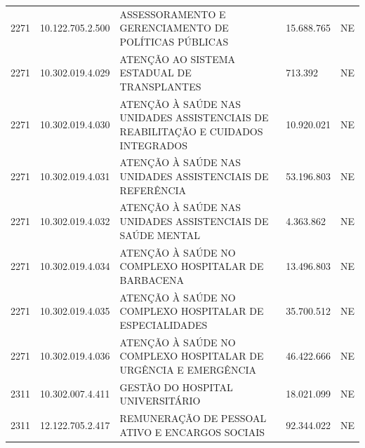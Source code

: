 \documentclass{article}
\begin{document}
\begin{longtable}[c]{m{1cm}|m{2cm}|m{10cm}|m{2cm}|m{1cm}}
\multicolumn{1}{C{1cm}|}{2271} & \multicolumn{1}{C{2cm}|}{10.122.705.2.500} & \multicolumn{1}{L{10cm}|}{ASSESSORAMENTO E GERENCIAMENTO DE POLÍTICAS PÚBLICAS} & \multicolumn{1}{R{2cm}|}{15.688.765} & \multicolumn{1}{C{1cm}}{NE} \\
\multicolumn{1}{C{1cm}|}{2271} & \multicolumn{1}{C{2cm}|}{10.302.019.4.029} & \multicolumn{1}{L{10cm}|}{ATENÇÃO  AO SISTEMA ESTADUAL DE TRANSPLANTES} & \multicolumn{1}{R{2cm}|}{713.392} & \multicolumn{1}{C{1cm}}{NE} \\
\multicolumn{1}{C{1cm}|}{2271} & \multicolumn{1}{C{2cm}|}{10.302.019.4.030} & \multicolumn{1}{L{10cm}|}{ATENÇÃO À SAÚDE NAS UNIDADES ASSISTENCIAIS DE REABILITAÇÃO E CUIDADOS INTEGRADOS} & \multicolumn{1}{R{2cm}|}{10.920.021} & \multicolumn{1}{C{1cm}}{NE} \\
\multicolumn{1}{C{1cm}|}{2271} & \multicolumn{1}{C{2cm}|}{10.302.019.4.031} & \multicolumn{1}{L{10cm}|}{ATENÇÃO À SAÚDE NAS UNIDADES ASSISTENCIAIS DE REFERÊNCIA} & \multicolumn{1}{R{2cm}|}{53.196.803} & \multicolumn{1}{C{1cm}}{NE} \\
\multicolumn{1}{C{1cm}|}{2271} & \multicolumn{1}{C{2cm}|}{10.302.019.4.032} & \multicolumn{1}{L{10cm}|}{ATENÇÃO À SAÚDE NAS UNIDADES ASSISTENCIAIS DE SAÚDE MENTAL} & \multicolumn{1}{R{2cm}|}{4.363.862} & \multicolumn{1}{C{1cm}}{NE} \\
\multicolumn{1}{C{1cm}|}{2271} & \multicolumn{1}{C{2cm}|}{10.302.019.4.034} & \multicolumn{1}{L{10cm}|}{ATENÇÃO À SAÚDE NO COMPLEXO HOSPITALAR DE BARBACENA} & \multicolumn{1}{R{2cm}|}{13.496.803} & \multicolumn{1}{C{1cm}}{NE} \\
\multicolumn{1}{C{1cm}|}{2271} & \multicolumn{1}{C{2cm}|}{10.302.019.4.035} & \multicolumn{1}{L{10cm}|}{ATENÇÃO À SAÚDE NO COMPLEXO HOSPITALAR DE ESPECIALIDADES} & \multicolumn{1}{R{2cm}|}{35.700.512} & \multicolumn{1}{C{1cm}}{NE} \\
\multicolumn{1}{C{1cm}|}{2271} & \multicolumn{1}{C{2cm}|}{10.302.019.4.036} & \multicolumn{1}{L{10cm}|}{ATENÇÃO À SAÚDE NO COMPLEXO HOSPITALAR DE URGÊNCIA E EMERGÊNCIA} & \multicolumn{1}{R{2cm}|}{46.422.666} & \multicolumn{1}{C{1cm}}{NE} \\
\multicolumn{1}{C{1cm}|}{2311} & \multicolumn{1}{C{2cm}|}{10.302.007.4.411} & \multicolumn{1}{L{10cm}|}{GESTÃO DO HOSPITAL UNIVERSITÁRIO} & \multicolumn{1}{R{2cm}|}{18.021.099} & \multicolumn{1}{C{1cm}}{NE} \\
\multicolumn{1}{C{1cm}|}{2311} & \multicolumn{1}{C{2cm}|}{12.122.705.2.417} & \multicolumn{1}{L{10cm}|}{REMUNERAÇÃO DE PESSOAL ATIVO E ENCARGOS SOCIAIS} & \multicolumn{1}{R{2cm}|}{92.344.022} & \multicolumn{1}{C{1cm}}{NE} \\

\end{longtable}
\end{document}
